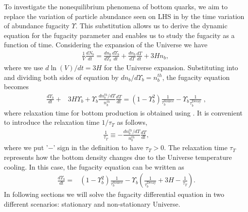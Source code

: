 To investigate the nonequilibrium phenomena of bottom quarks, we aim to replace the variation of particle abundance seen on LHS in  by the time variation of abundance fugacity $\Upsilon$.
This substitution allows us to derive the dynamic equation for the fugacity parameter and enables us to study the fugacity as a function of time. Considering the expansion of the Universe we have
\begin{align}\label{number_dilution}
\frac{1}{V}\frac{dN_b}{dt}=\frac{dn_b}{d\Upsilon_b}\frac{d\Upsilon_b}{dt}+\frac{dn_b}{dT}\frac{dT}{dt}+3Hn_b,\;
\end{align}
where we use $d\ln(V)/dt=3H$ for the Universe expansion. Substituting  into  and dividing both sides of equation by $dn_b/{d\Upsilon_b}=n^{th}_b$, the fugacity equation becomes
\begin{align}
\frac{d\Upsilon_b}{dt}+&3H\Upsilon_b+\Upsilon_b\frac{dn^{th}_b/dT}{n^{th}_b}\frac{dT}{dt}=\left(1-\Upsilon_b^2\right)\frac{1}{\tau_{b}^{\mathrm{Source}}}-\Upsilon_b\frac{1}{\tau^{\mathrm{Decay}}_b}\;,
\end{align}
where relaxation time for bottom production is obtained using . It is convenient to introduce the relaxation time $1/\tau_T$ as follows,
\begin{align}
\frac{1}{\tau_T}\equiv-\frac{dn^{th}_b/dT}{n^{th}_b}\frac{dT}{dt},
\end{align}
where we put '$-$' sign in the definition to have $\tau_T>0$. The relaxation time $\tau_T$ represents how the bottom density changes due to the Universe temperature cooling. In this case, the fugacity equation can be written as
\begin{align}\label{Fugacity_Eq0}
\frac{d\Upsilon_b}{dt}\!\!=&(1-\Upsilon_{b}^2)\frac{1}{\tau_{b}^{\mathrm{Source}}}
\!-\!\Upsilon_{b}\left(\frac{1}{\tau^{\mathrm{Decay}}_b}+3H\!-\!\frac{1}{\tau_T}\right).
\end{align}
In following sections we will solve the fugacity differential equation in two different scenarios: stationary and non-stationary Universe.

